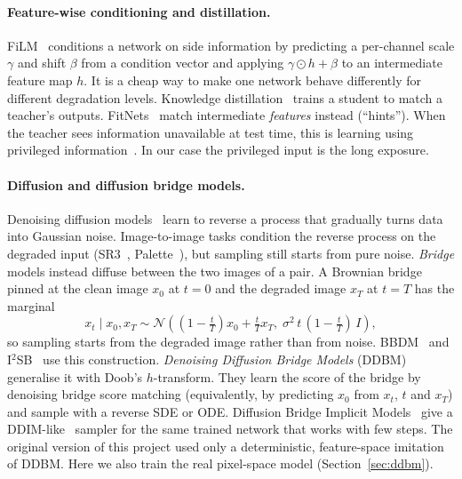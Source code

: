 \paragraph{Feature-wise conditioning and distillation.}
FiLM~\cite{perez2018film} conditions a network on side information by predicting a per-channel scale $\gamma$ and shift $\beta$ from a condition vector and applying $\gamma\odot h+\beta$ to an intermediate feature map $h$. It is a cheap way to make one network behave differently for different degradation levels. Knowledge distillation~\cite{hinton2015distilling} trains a student to match a teacher's outputs. FitNets~\cite{romero2015fitnets} match intermediate \emph{features} instead (``hints''). When the teacher sees information unavailable at test time, this is learning using privileged information~\cite{vapnik2009lupi}. In our case the privileged input is the long exposure.

\paragraph{Diffusion and diffusion bridge models.}
Denoising diffusion models~\cite{ho2020ddpm,song2021sde} learn to reverse a process that gradually turns data into Gaussian noise. Image-to-image tasks condition the reverse process on the degraded input (SR3~\cite{saharia2022sr3}, Palette~\cite{saharia2022palette}), but sampling still starts from pure noise. \emph{Bridge} models instead diffuse between the two images of a pair. A Brownian bridge pinned at the clean image $x_0$ at $t=0$ and the degraded image $x_T$ at $t=T$ has the marginal
\begin{equation}
x_t \mid x_0, x_T \sim \mathcal{N}\!\left((1-\tfrac{t}{T})x_0 + \tfrac{t}{T}x_T,\; \sigma^2\, t\,(1-\tfrac{t}{T})\,I\right),
\label{eq:bb}
\end{equation}
so sampling starts from the degraded image rather than from noise. BBDM~\cite{li2023bbdm} and I$^2$SB~\cite{liu2023i2sb} use this construction. \emph{Denoising Diffusion Bridge Models} (DDBM)~\cite{zhou2024ddbm} generalise it with Doob's $h$-transform. They learn the score of the bridge by denoising bridge score matching (equivalently, by predicting $x_0$ from $x_t$, $t$ and $x_T$) and sample with a reverse SDE or ODE. Diffusion Bridge Implicit Models~\cite{zheng2025dbim} give a DDIM-like~\cite{song2021ddim} sampler for the same trained network that works with few steps. The original version of this project used only a deterministic, feature-space imitation of DDBM. Here we also train the real pixel-space model (Section~\ref{sec:ddbm}).

